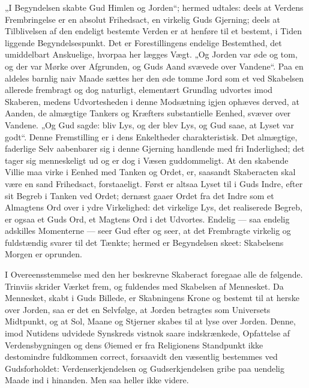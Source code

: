 \documentclass[12pt]{book}
\begin{document}
„I Begyndelsen skabte Gud Himlen og Jorden“; hermed udtales: deels
at Verdens Frembringelse er en absolut Frihedsact, en virkelig Guds
Gjerning; deels at Tilblivelsen af den endeligt bestemte Verden er
at henføre til et bestemt, i Tiden liggende Begyndelsespunkt. Det er
Forestillingens endelige Bestemthed, det umiddelbart Anskuelige,
hvorpaa her lægges Vægt. „Og Jorden var øde og tom, og der var Mørke
over Afgrunden, og Guds Aand svævede over Vandene“. Paa en aldeles
barnlig naiv Maade sættes her den øde tomme Jord som et ved
Skabelsen allerede frembragt og dog naturligt, elementært Grundlag
udvortes imod Skaberen, medens Udvortesheden i denne Modsætning igjen
ophæves derved, at Aanden, de almægtige Tankers og Kræfters
substantielle Eenhed, svæver over Vandene. „Og Gud sagde: bliv Lys,
og der blev Lys, og Gud saae, at Lyset var godt“. Denne Fremstilling
er i dens Enkeltheder charakteristisk. Det almægtige, faderlige Selv
aabenbarer sig i denne Gjerning handlende med fri Inderlighed; det
tager sig menneskeligt ud og er dog i Væsen guddommeligt. At den
skabende Villie maa virke i Eenhed med Tanken og Ordet, er,
saasandt Skaberacten skal være en
sand Frihedsact, forstaaeligt. Først er altsaa Lyset til i Guds
Indre, efter sit Begreb i Tanken ved Ordet; dernæst gaaer Ordet fra
det Indre som et Almagtens Ord over i ydre Virkelighed: det
virkelige Lys, det realiserede Begreb, er ogsaa et Guds Ord, et
Magtens Ord i det Udvortes. Endelig --- saa endelig adskilles
Momenterne --- seer Gud efter og seer, at det Frembragte virkelig og
fuldstændig svarer til det Tænkte; hermed er Begyndelsen skeet:
Skabelsens Morgen er oprunden.

I Overeensstemmelse med den her beskrevne Skaberact foregaae alle de
følgende. Trinviis skrider Værket frem, og fuldendes med Skabelsen
af Mennesket. Da Mennesket, skabt i Guds Billede, er Skabningens
Krone og bestemt til at herske over Jorden, saa er det en Selvfølge,
at Jorden betragtes som Universets Midtpunkt, og at Sol, Maane og
Stjerner skabes til at lyse over Jorden. Denne, imod Nutidens
udvidede Synskreds vistnok saare indskrænkede, Opfattelse af
Verdensbygningen og dens Øiemed er fra Religionens Standpunkt ikke
destomindre fuldkommen correct, forsaavidt den væsentlig bestemmes
ved Gudsforholdet: Verdenserkjendelsen og Gudserkjendelsen gribe paa
uendelig Maade ind i hinanden. Men saa heller ikke videre.
\end{document}
